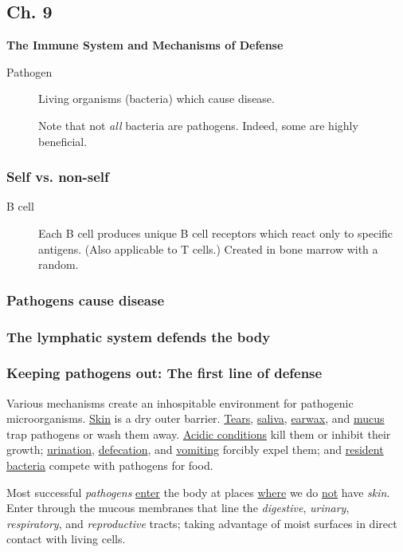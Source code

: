 \documentclass[11pt]{article}
\begin{document}
\subsection{Ch. 9}
\label{sec:org671c426}
\textbf{The Immune System and Mechanisms of Defense}

\begin{description}
\item[{Pathogen}] Living organisms (bacteria) which cause disease.

Note that not \emph{all} bacteria are pathogens. Indeed, some are highly
beneficial.
\end{description}

\subsubsection{Self vs. non-self}
\label{sec:org7089e1d}
\begin{description}
\item[{B cell}] Each B cell produces unique B cell receptors which react only to
specific antigens. (Also applicable to T cells.) Created in bone marrow
with a random.
\end{description}

\subsubsection{Pathogens cause disease}
\label{sec:org31dc097}

\subsubsection{The lymphatic system defends the body}
\label{sec:orga4acf92}

\subsubsection{Keeping pathogens out: The first line of defense}
\label{sec:org58d9fef}
Various mechanisms create an inhospitable environment for pathogenic
microorganisms. \uline{Skin} is a dry outer barrier. \uline{Tears}, \uline{saliva}, \uline{earwax}, and \uline{mucus}
trap pathogens or wash them away. \uline{Acidic conditions} kill them or inhibit their
growth; \uline{urination}, \uline{defecation}, and \uline{vomiting} forcibly expel them; and \uline{resident
bacteria} compete with pathogens for food.

Most successful \emph{pathogens} \uline{enter} the body at places \uline{where} we do \uline{not} have \emph{skin}.
Enter through the mucous membranes that line the \emph{digestive}, \emph{urinary},
\emph{respiratory}, and \emph{reproductive} tracts; taking advantage of moist surfaces in
direct contact with living cells.
\end{document}
